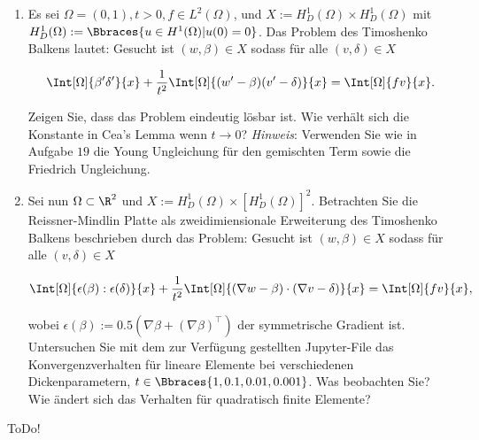 
\begin{exercise}

\begin{enumerate}[label = \textbf{\alph*)}]
  \item Es sei $\Omega = (0,1), t >0, f \in L^2(\Omega)$, und $X := H^1_D(\Omega) \times H^1_D(\Omega)$ mit $H^1_D(\Omega) := \Bbraces{u \in H^1(\Omega) | u(0) = 0}$.
  Das Problem des Timoshenko Balkens lautet: Gesucht ist $(w, \beta) \in X$ sodass für alle $(v, \delta) \in X$

  \begin{align}
    \Int[\Omega]{\beta^\prime \delta^\prime}{x}
    +
    \frac{1}{t^2} \Int[\Omega]{(w^\prime - \beta)(v^\prime - \delta)}{x}
    =
    \Int[\Omega]{fv}{x}.
  \end{align}

  Zeigen Sie, dass das Problem eindeutig lösbar ist. Wie verhält sich die Konstante in Cea's Lemma wenn $t \rightarrow 0$? \textit{Hinweis}: Verwenden Sie wie in Aufgabe $19$ die Young Ungleichung für den gemischten Term sowie die Friedrich Ungleichung.

  \item Sei nun $\Omega \subset \R^2$ und $X := H^1_D(\Omega) \times [H^1_D(\Omega)]^2$. Betrachten Sie die Reissner-Mindlin Platte als zweidimiensionale Erweiterung des Timoshenko Balkens beschrieben durch das Problem:
  Gesucht ist $(w, \beta) \in X$ sodass für alle $(v, \delta) \in X$

  \begin{align}
    \Int[\Omega]{\epsilon(\beta):\epsilon(\delta)}{x}
    +
    \frac{1}{t^2} \Int[\Omega]{(\nabla w - \beta) \cdot (\nabla v - \delta)}{x}
    =
    \Int[\Omega]{fv}{x},
  \end{align}

  wobei $\epsilon(\beta) := 0.5(\nabla \beta + (\nabla \beta)^\top)$ der symmetrische Gradient ist. Untersuchen Sie mit dem zur Verfügung gestellten Jupyter-File das Konvergenzverhalten für lineare Elemente bei verschiedenen Dickenparametern, $t \in \Bbraces{1, 0.1, 0.01, 0.001}$. Was beobachten Sie? Wie ändert sich das Verhalten für quadratisch finite Elemente?
\end{enumerate}

\end{exercise}


\begin{solution}

ToDo!

\end{solution}

